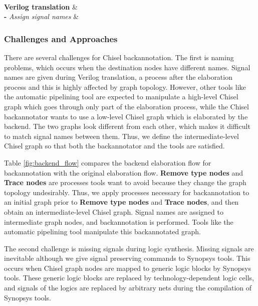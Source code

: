 \begin{table*}
\begin{tabular}
		 \\
		\hline
		{\bf Verilog translation} & \\
		{\bf -} \emph{Assign signal names} & \\
		\hline
	\end{tabular}
	\caption{Comparison between the original backend elaboration flow and the backend elaboration flow for backannotation. Note that signal names are assigned to intermediate-level Chisel graph nodes while they are given during Verilog translation in the original backend.}
	\label{fig:backend_flow}
\end{table*}

\subsubsection{Challenges and Approaches} 
\label{sec:challenges}
There are several challenges for Chisel backannotation. The first is naming problems, which occurs when the destination nodes have different names. Signal names are given during Verilog translation, a process after the elaboration process and this is highly affected by graph topology. However, other tools like the automatic pipelining tool are expected to manipulate a high-level Chisel graph which goes through only part of the elaboration process, while the Chisel backannotator wants to use a low-level Chisel graph which is elaborated by the backend. The two graphs look different from each other, which makes it difficult to match signal names between them. Thus, we define the intermediate-level Chisel graph so that both the backannotator and the tools are satisfied.

Table \ref{fig:backend_flow} compares the backend elaboration flow for backannotation with the original elaboration flow. \textbf{Remove type nodes} and \textbf{Trace nodes} are processes tools want to avoid because they change the graph topology undesirably. Thus, we apply processes necessary for backannotation to an initial graph prior to \textbf{Remove type nodes} and \textbf{Trace nodes}, and then obtain an intermediate-level Chisel graph. Signal names are assigned to intermediate graph nodes, and backannotation is performed. Tools like the automatic pipelining tool manipulate this backannotated graph.

The second challenge is missing signals during logic synthesis. Missing signals are inevitable although we give signal preserving commands to Synopsys tools. This occurs when Chisel graph nodes are mapped to generic logic blocks by Synopsys tools. These generic logic blocks are replaced by technology-dependent logic cells, and signals of the logics are replaced by arbitrary nets during the compilation of Synopsys tools.

